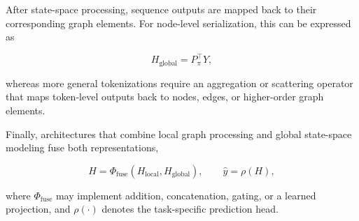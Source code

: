 \documentclass[acmsmall]{acmart}
\begin{document}
After state-space processing, sequence outputs are mapped back to their
corresponding graph elements. For node-level serialization, this can be
expressed as

\begin{equation}
H_{\mathrm{global}}
=
P_{\pi}^{\top}Y,
\label{eq:graph-restoration}
\end{equation}

whereas more general tokenizations require an aggregation or scattering
operator that maps token-level outputs back to nodes, edges, or higher-order
graph elements.

Finally, architectures that combine local graph processing and global
state-space modeling fuse both representations,

\begin{equation}
H
=
\Phi_{\mathrm{fuse}}
\left(
H_{\mathrm{local}},
H_{\mathrm{global}}
\right),
\qquad
\hat{y}
=
\rho(H),
\label{eq:graph-mamba-fusion}
\end{equation}

where $\Phi_{\mathrm{fuse}}$ may implement addition, concatenation, gating, or
a learned projection, and $\rho(\cdot)$ denotes the task-specific prediction
head.
\end{document}
